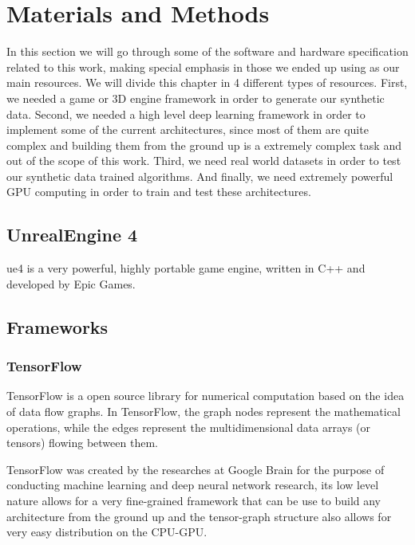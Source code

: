 
\chapter{Materials and Methods}
\label{metodologia}
In this section we will go through some of the software and hardware specification related to this work, making special emphasis in those we ended up using as our main resources. We will divide this chapter in 4 different types of resources. First, we needed a game or 3D engine framework in order to generate our synthetic data. Second, we needed a high level deep learning framework in order to implement some of the current architectures, since most of them are quite complex and building them from the ground up is a extremely complex task and out of the scope of this work. Third, we need real world datasets in order to test our synthetic data trained algorithms. And finally, we need extremely powerful GPU computing in order to train and test these architectures.

\section{UnrealEngine 4}
\gls{ue4} is a very powerful, highly portable game engine, written in C++ and developed by Epic Games.

\section{Frameworks}

\subsection{TensorFlow}
TensorFlow is a open source library for numerical computation based on the idea of data flow graphs. In TensorFlow, the graph nodes represent the mathematical operations, while the edges represent the multidimensional data arrays (or tensors) flowing between them.

TensorFlow was created by the researches at Google Brain for the purpose of conducting machine learning and deep neural network research, its low level nature allows for a very fine-grained framework that can be use to build any architecture from the ground up and the tensor-graph structure also allows for very easy distribution on the CPU-GPU.


